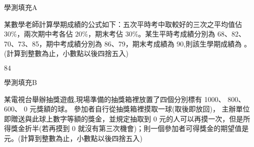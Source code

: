 \begin{QUESTIONS}
    \begin{QUESTION}
        \begin{ExamInfo}{93}{學測}{填充}{A}
        \end{ExamInfo}
        \begin{ExamAnsRateInfo}{70}{90}{77}{43}
        \end{ExamAnsRateInfo}
        \begin{QBODY}
            某數學老師計算學期成績的公式如下：五次平時考中取較好的三次之平均值佔 $30\%$，兩次期中考各佔 $20\%$，期末考佔 $30\%$。某生平時考成績分別為 68、82、70、73、85，期中考成績分別為 86、79，期末考成績為 90,則該生學期成績為 
            \TCNBOX{\TCN\TCN}。(計算到整數為止，小數點以後四捨五入)
        \end{QBODY}
        \begin{QFROMS}
        \end{QFROMS}
        \begin{QTAGS}\end{QTAGS}
        \begin{QANS}
            $84$
        \end{QANS}
        \begin{QSOLLIST}
        \end{QSOLLIST}
        \begin{QEMPTYSPACE}
        \end{QEMPTYSPACE}
    \end{QUESTION}
    \begin{QUESTION}
        \begin{ExamInfo}{93}{學測}{填充}{B}
        \end{ExamInfo}
        \begin{ExamAnsRateInfo}{25}{57}{16}{2}
        \end{ExamAnsRateInfo}
        \begin{QBODY}
            某電視台舉辦抽獎遊戲,現場準備的抽獎箱裡放置了四個分別標有 1000、 800、 600、 0 元獎額的球。
            參加者自行從抽獎箱裡摸取一球(取後即放回)，
            主辦單位即贈送與此球上數字等額的獎金，並規定抽取到 0 元的人可以再摸一次，但是所得獎金折半(若再摸到 0 就沒有第三次機會)；則一個參加者可得獎金的期望值是 
            \TCNBOX{\TCN\TCN\TCN} 元。(計算到整數為止，小數點以後四捨五入)
        \end{QBODY}
        \begin{QFROMS}
        \end{QFROMS}

\end{QUESTION}
\end{QUESTIONS}
